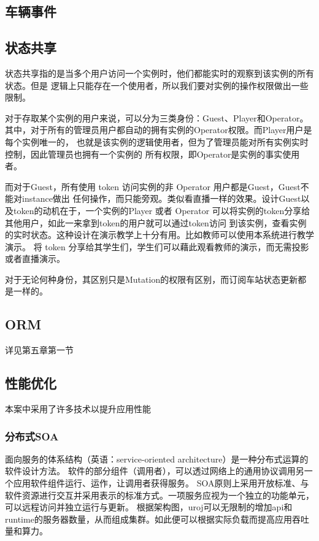 \subsection{车辆事件}
\subsection{状态共享}
状态共享指的是当多个用户访问一个实例时，他们都能实时的观察到该实例的所有状态。但是
逻辑上只能存在一个使用者，所以我们要对实例的操作权限做出一些限制。

对于存取某个实例的用户来说，可以分为三类身份：Guest、Player和Operator。
其中，对于所有的管理员用户都自动的拥有实例的Operator权限。而Player用户是每个实例唯一的，
也就是该实例的逻辑使用者，但为了管理员能对所有实例实时控制，因此管理员也拥有一个实例的
所有权限，即Operator是实例的事实使用者。

而对于Guest，所有使用 token 访问实例的非 Operator 用户都是Guest，Guest不能对instance做出
任何操作，而只能旁观。类似看直播一样的效果。设计Guest以及token的动机在于，一个实例的Player
或者 Operator 可以将实例的token分享给其他用户，如此一来拿到token的用户就可以通过token访问
到该实例，查看实例的实时状态。这种设计在演示教学上十分有用。比如教师可以使用本系统进行教学演示。
将 token 分享给其学生们，学生们可以藉此观看教师的演示，而无需投影或者直播演示。

对于无论何种身份，其区别只是Mutation的权限有区别，而订阅车站状态更新都是一样的。
\subsection{ORM}
详见第五章第一节

\subsection{性能优化}
本案中采用了许多技术以提升应用性能
\subsubsection{分布式SOA}
面向服务的体系结构（英语：service-oriented architecture）是一种分布式运算的软件设计方法。
软件的部分组件（调用者），可以透过网络上的通用协议调用另一个应用软件组件运行、运作，让调用者获得服务。
SOA原则上采用开放标准、与软件资源进行交互并采用表示的标准方式。一项服务应视为一个独立的功能单元，可以远程访问并独立运行与更新。
根据架构图，uroj可以无限制的增加api和runtime的服务器数量，从而组成集群。如此便可以根据实际负载而提高应用吞吐量和算力。
